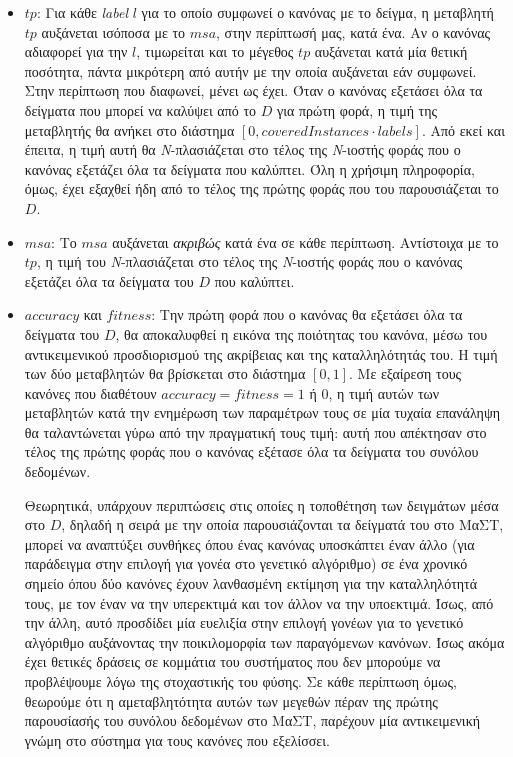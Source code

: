\begin{itemize}

\item $tp$: Για κάθε \emph{label} $l$ για το οποίο συμφωνεί ο κανόνας με το δείγμα, η μεταβλητή $tp$ αυξάνεται ισόποσα με το $msa$, στην περίπτωσή μας, κατά ένα. Αν ο κανόνας αδιαφορεί για την $l$, τιμωρείται και το μέγεθος $tp$ αυξάνεται κατά μία θετική ποσότητα, πάντα μικρότερη από αυτήν με την οποία αυξάνεται εάν συμφωνεί. Στην περίπτωση που διαφωνεί, μένει ως έχει. Όταν ο κανόνας εξετάσει όλα τα δείγματα που μπορεί να καλύψει από το $D$ για πρώτη φορά, η τιμή της μεταβλητής θα ανήκει στο διάστημα $\left[0, coveredInstances \cdot labels\right]$. Από εκεί και έπειτα, η τιμή αυτή θα \emph{N}-πλασιάζεται στο τέλος της \emph{N}-ιοστής φοράς που ο κανόνας εξετάζει όλα τα δείγματα που καλύπτει. Όλη η χρήσιμη πληροφορία, όμως, έχει εξαχθεί ήδη από το τέλος της πρώτης φοράς που του παρουσιάζεται το $D$.
  
\item $msa$: Το $msa$ αυξάνεται \emph{ακριβώς} κατά ένα σε κάθε περίπτωση. Αντίστοιχα με το $tp$, η τιμή του \emph{N}-πλασιάζεται στο τέλος της \emph{N}-ιοστής φοράς που ο κανόνας εξετάζει όλα τα δείγματα του $D$ που καλύπτει.

\item $accuracy$ και $fitness$: Την πρώτη φορά που ο κανόνας θα εξετάσει όλα τα δείγματα του $D$, θα αποκαλυφθεί η εικόνα της ποιότητας του κανόνα, μέσω του αντικειμενικού προσδιορισμού της ακρίβειας και της καταλληλότητάς του. Η τιμή των δύο μεταβλητών θα βρίσκεται στο διάστημα $\left[0,1\right]$. Με εξαίρεση τους κανόνες που διαθέτουν $accuracy = fitness = 1$ ή $0$, η τιμή αυτών των μεταβλητών κατά την ενημέρωση των παραμέτρων τους σε μία τυχαία επανάληψη θα ταλαντώνεται γύρω από την πραγματική τους τιμή: αυτή που απέκτησαν στο τέλος της πρώτης φοράς που ο κανόνας εξέτασε όλα τα δείγματα του συνόλου δεδομένων. 

Θεωρητικά, υπάρχουν περιπτώσεις στις οποίες η τοποθέτηση των δειγμάτων μέσα στο $D$, δηλαδή η σειρά με την οποία παρουσιάζονται τα δείγματά του στο ΜαΣΤ, μπορεί να αναπτύξει συνθήκες όπου ένας κανόνας υποσκάπτει έναν άλλο (για παράδειγμα στην επιλογή για γονέα στο γενετικό αλγόριθμο) σε ένα χρονικό σημείο όπου δύο κανόνες έχουν λανθασμένη εκτίμηση για την καταλληλότητά τους, με τον έναν να την υπερεκτιμά και τον άλλον να την υποεκτιμά. Ίσως, από την άλλη, αυτό προσδίδει μία ευελιξία στην επιλογή γονέων για το γενετικό αλγόριθμο αυξάνοντας την ποικιλομορφία των παραγόμενων κανόνων. Ίσως ακόμα έχει θετικές δράσεις σε κομμάτια του συστήματος που δεν μπορούμε να προβλέψουμε λόγω της στοχαστικής του φύσης. Σε κάθε περίπτωση όμως, θεωρούμε ότι η αμεταβλητότητα αυτών των μεγεθών πέραν της πρώτης παρουσίασής του συνόλου δεδομένων στο ΜαΣΤ, παρέχουν μία αντικειμενική γνώμη στο σύστημα για τους κανόνες που εξελίσσει.

\end{itemize}

